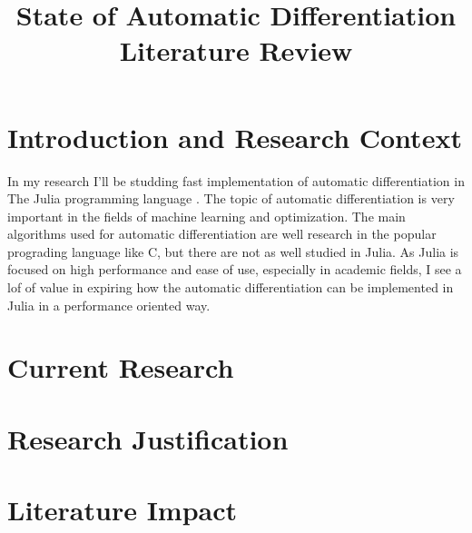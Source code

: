 \documentclass[conference,a4paper]{IEEEtran}
\begin{document}
\title{State of Automatic Differentiation\\ Literature Review}

\author{
}

\maketitle


\section{Introduction and Research Context}

In my research I'll be studding fast implementation of automatic differentiation in The Julia programming language \cite{JuliaLanguage:Homepage}.
The topic of automatic differentiation is very important in the fields of machine learning and optimization.
The main algorithms used for automatic differentiation are well research in the popular prograding language like C, but there are not as well studied in Julia.
As Julia is focused on high performance and ease of use, especially in academic fields, I see a lof of value in expiring how the automatic differentiation can be implemented in Julia in a performance oriented way.


\section{Current Research}

\section{Research Justification}

\section{Literature Impact}



\end{document}
